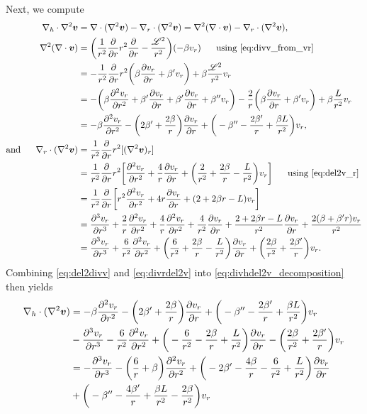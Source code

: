 \documentclass[12pt]{article} %
\newcommand{\pderiv}[2]{\frac{\partial#1}{\partial#2}}
\newcommand{\ppderiv}[2]{\frac{\partial^2#1}{\partial#2^2}}
\newcommand{\pppderiv}[2]{\frac{\partial^3#1}{\partial#2^3}}
\newcommand{\andd}{\text{and}\ \ \ \ \ }
\newcommand{\five}{\ \ \ \ \ }
\newcommand{\Div}{\nabla\cdot}
\newcommand{\divh}{\nabla_h\cdot}
\newcommand{\divr}{\nabla_r\cdot}
\newcommand{\db}{\beta^\prime}
\newcommand{\ddb}{\beta^{\prime\prime}}
\begin{document}
	Next, we compute
	\begin{align}
	\label{eq:divhdel2v_decomposition}	\divh\nabla^2\bm{v}&=\Div(\nabla^2\bm{v}) - \divr(\nabla^2\bm{v}) = \nabla^2(\Div\bm{v}) -\divr(\nabla^2\bm{v}),\\
	\nabla^2(\Div\bm{v}) &= \bigg{(}\frac{1}{r^2}\pderiv{}{r}r^2\pderiv{}{r}-\frac{\mathscr{L}^2}{r^2}\bigg{)}(-\beta v_r)\five \text{using \eqref{eq:divv_from_vr}}\nonumber\\
	&= -\frac{1}{r^2}\pderiv{}{r}r^2\bigg{(}\beta\pderiv{v_r}{r}+\beta^\prime v_r\bigg{)}+\beta\frac{\mathscr{L}^2}{r^2}v_r\nonumber\\
	&= - \bigg{(}\beta\ppderiv{v_r}{r}+ \db\pderiv{v_r}{r}+\db \pderiv{v_r}{r} +\ddb v_r\bigg{)}\nonumber - \frac{2}{r}\bigg{(}\beta\pderiv{v_r}{r}+\db v_r\bigg{)} + \beta\frac{L}{r^2}v_r\nonumber\\
		\label{eq:del2divv}&= -\beta\ppderiv{v_r}{r} -\bigg{(}2\db + \frac{2\beta}{r}\bigg{)}\pderiv{v_r}{r} + \bigg{(}-\ddb-\frac{2\db}{r} + \frac{\beta L}{r^2}\bigg{)}v_r,\\
	\andd \divr(\nabla^2\bm{v}) &= \frac{1}{r^2}\pderiv{}{r}r^2[(\nabla^2\bm{v})_r]\nonumber\\
	&= \frac{1}{r^2}\pderiv{}{r}r^2\bigg{[}\ppderiv{v_r}{r}+\frac{4}{r}\pderiv{v_r}{r} +\bigg{(}\frac{2}{r^2}+\frac{2\beta}{r}-\frac{L}{r^2}\bigg{)}v_r\bigg{]}\five\text{using \eqref{eq:del2v_r}}\nonumber\\
	&= \frac{1}{r^2}\pderiv{}{r}\bigg{[}r^2\ppderiv{v_r}{r}+4r\pderiv{v_r}{r}+(2+2\beta r-L)v_r\bigg{]}\nonumber\\
	&= \pppderiv{v_r}{r} + \frac{2}{r}\ppderiv{v_r}{r}+ \frac{4}{r}\ppderiv{v_r}{r} + \frac{4}{r^2}\pderiv{v_r}{r} +\frac{2+2\beta r -L}{r^2}\pderiv{v_r}{r} + \frac{2(\beta + \db r) v_r}{r^2}\nonumber\\
	\label{eq:divrdel2v}	&= \pppderiv{v_r}{r} + \frac{6}{r^2}\ppderiv{v_r}{r} + \bigg{(}\frac{6}{r^2}+\frac{2\beta}{r}-\frac{L}{r^2}\bigg{)}\pderiv{v_r}{r} + \bigg{(}\frac{2\beta}{r^2} + \frac{2\db}{r}\bigg{)}v_r.
	\end{align}
	Combining \eqref{eq:del2divv} and \eqref{eq:divrdel2v} into \eqref{eq:divhdel2v_decomposition} then yields
	\begin{align}
	\divh(\nabla^2\bm{v}) &=  -\beta\ppderiv{v_r}{r} -\bigg{(}2\db + \frac{2\beta}{r}\bigg{)}\pderiv{v_r}{r} + \bigg{(}-\ddb-\frac{2\db}{r} + \frac{\beta L}{r^2}\bigg{)}v_r\nonumber\\	
	 &-\pppderiv{v_r}{r} - \frac{6}{r^2}\ppderiv{v_r}{r} + \bigg{(}-\frac{6}{r^2}-\frac{2\beta}{r}+\frac{L}{r^2}\bigg{)}\pderiv{v_r}{r} - \bigg{(}\frac{2\beta}{r^2} + \frac{2\db}{r}\bigg{)}v_r\nonumber\\
	 &= -\pppderiv{v_r}{r} - \bigg{(}\frac{6}{r}+\beta\bigg{)}\ppderiv{v_r}{r}+\bigg{(}-2\db -\frac{4\beta}{r} -\frac{6}{r^2} + \frac{L}{r^2}\bigg{)}\pderiv{v_r}{r}\nonumber\\
	 &+\bigg{(}-\ddb - \frac{4\db}{r} + \frac{\beta L}{r^2} -\frac{2\beta}{r^2} \bigg{)}v_r
	 \label{eq:divhdel2v_resolved}
	\end{align}
\end{document}
